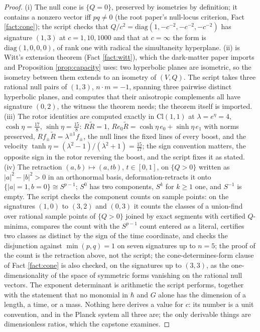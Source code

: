 \documentclass[11pt]{article}
\theoremstyle{definition}
\newcommand{\Cl}{\mathrm{Cl}}
\begin{document}
\begin{proof}
(i) The null cone is $\{Q = 0\}$, preserved by isometries by definition; it contains a nonzero vector iff $pq \neq 0$ (the root paper's null-locus criterion, Fact \ref{fact:cone}); the script checks that $Q/c^{2} = \mathrm{diag}(1, -c^{-2}, -c^{-2}, -c^{-2})$ has signature $(1,3)$ at $c = 1, 10, 1000$ and that at $c = \infty$ the form is $\mathrm{diag}(1, 0, 0, 0)$, of rank one with radical the simultaneity hyperplane. (ii) is Witt's extension theorem (Fact \ref{fact:witt}), which the dark-matter paper imports and Proposition \ref{prop:capacity} uses: two hyperbolic planes are isometric, so the isometry between them extends to an isometry of $(V, Q)$. The script takes three rational null pairs of $(1,3)$, $n \cdot m = -1$, spanning three pairwise distinct hyperbolic planes, and computes that their anisotropic complements all have signature $(0,2)$, the witness the theorem needs; the theorem itself is imported. (iii) The rotor identities are computed exactly in $\Cl(1,1)$ at $\lambda = e^{\eta} = 4$, $\cosh\eta = \tfrac{17}{8}$, $\sinh\eta = \tfrac{15}{8}$: $R\tilde{R} = 1$, $Re_{0}\tilde{R} = \cosh\eta\,e_{0} + \sinh\eta\,e_{1}$ with norms preserved, $Rf_{\pm}\tilde{R} = \lambda^{\pm 1}f_{\pm}$, the null lines the fixed lines of every boost, and the velocity $\tanh\eta = (\lambda^{2} - 1)/(\lambda^{2} + 1) = \tfrac{15}{17}$; the sign convention matters, the opposite sign in the rotor reversing the boost, and the script fixes it as stated. (iv) The retraction $(a, b) \mapsto (a, tb)$, $t \in [0, 1]$, on $\{Q > 0\}$ written as $|a|^{2} - |b|^{2} > 0$ in an orthonormal basis, deformation-retracts it onto $\{|a| = 1, b = 0\} \cong S^{p-1}$; $S^{0}$ has two components, $S^{k}$ for $k \geq 1$ one, and $S^{-1}$ is empty. The script checks the component counts on sample points: on the signatures $(1,0)$ to $(3,2)$ and $(0,3)$ it counts the classes of a union-find over rational sample points of $\{Q > 0\}$ joined by exact segments with certified $Q$-minima, compares the count with the $S^{p-1}$ count entered as a literal, certifies two classes as distinct by the sign of the time coordinate, and checks the disjunction against $\min(p, q) = 1$ on seven signatures up to $n = 5$; the proof of the count is the retraction above, not the script; the cone-determines-form clause of Fact \ref{fact:cone} is also checked, on the signatures up to $(3,3)$, as the one-dimensionality of the space of symmetric forms vanishing on the rational null vectors. The exponent determinant is arithmetic the script performs, together with the statement that no monomial in $\hbar$ and $G$ alone has the dimension of a length, a time, or a mass. Nothing here derives a value for $c$: its number is a unit convention, and in the Planck system all three are; the only derivable things are dimensionless ratios, which the capstone examines.
\end{proof}
\end{document}
